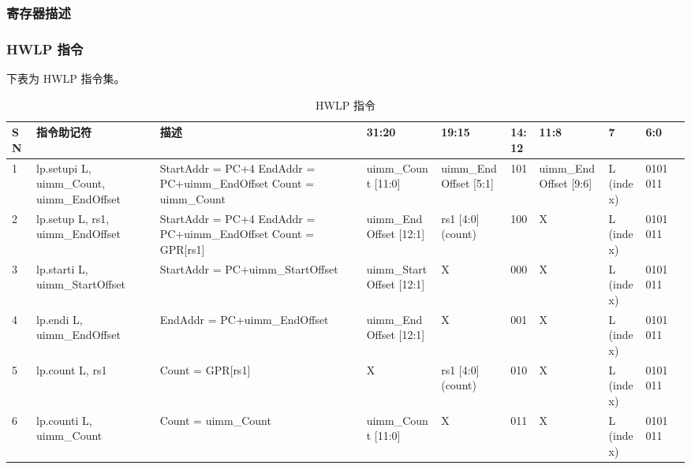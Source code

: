 \documentclass[main\_\_CN.tex]{subfiles}
\begin{document}


\subsubsection{寄存器描述}
\label{sec:riscvcpu-hwloop-reg-desc}


\clearpage
\begin{landscape}

\subsubsection{HWLP 指令}
\label{sec:riscvcpu-hwloop-instr}
下表为 HWLP 指令集。

\begin{table}[H]
    \caption{HWLP 指令}
    \label{tab:riscvcpu-hwlp-instr}
    \begin{tabular}{|p{0.3cm}|p{2.5cm}|p{6cm}|p{2.5cm}|p{2.5cm}|p{1cm}|p{2.5cm}|p{2cm}|p{2cm}|p{2cm}|}
        \hline\rowcolor{lightgray}
        \textbf{SN} & \textbf{指令助记符} & \textbf{描述} & \textbf{31:20} & \textbf{19:15} & \textbf{14:12}  & \textbf{11:8} & \textbf{7} & \textbf{6:0} \\
        \hline
        1 & lp.setupi L, uimm\_Count, uimm\_EndOffset & StartAddr = PC+4 \newline EndAddr = PC+uimm\_EndOffset \newline Count = uimm\_Count & uimm\_Count [11:0] & uimm\_EndOffset [5:1] &  101 & uimm\_EndOffset [9:6] & L (index) & 0101011\\
        \hline
        2 & lp.setup L, rs1, uimm\_EndOffset & StartAddr = PC+4 \newline EndAddr = PC+uimm\_EndOffset \newline Count = GPR[rs1] & uimm\_EndOffset [12:1]  & rs1 [4:0] (count) & 100 & X & L (index) & 0101011 \\
        \hline
        3 & lp.starti L, uimm\_StartOffset & StartAddr = PC+uimm\_StartOffset  & uimm\_StartOffset [12:1] & X & 000 & X & L (index) & 0101011 \\
        \hline
        4 & lp.endi L, uimm\_EndOffset & EndAddr = PC+uimm\_EndOffset & uimm\_EndOffset [12:1] & X & 001 & X & L (index) & 0101011\\
        \hline
        5 & lp.count L, rs1 & Count = GPR[rs1] & X & rs1 [4:0] (count) & 010 & X & L (index) & 0101011\\
        \hline
        6 & lp.counti L, uimm\_Count & Count = uimm\_Count & uimm\_Count [11:0] & X & 011 & X & L (index) & 0101011\\
        \hline
    \end{tabular}
\end{table}

\end{landscape}
\restoregeometry
\clearpage
\end{document}
